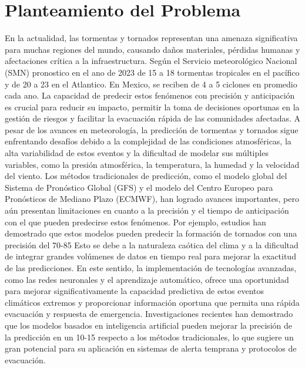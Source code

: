 \documentclass{article}
\begin{document}
\section{Planteamiento del Problema}
En la actualidad, las tormentas y tornados representan una amenaza significativa para muchas regiones del mundo, causando daños materiales, pérdidas humanas y afectaciones crítica a la infraestructura. Según el Servicio meteorológico Nacional (SMN) pronostico en el ano de 2023 de 15 a 18 tormentas tropicales en el pacífico y de 20 a 23 en el Atlantico. En Mexico, se reciben de 4 a 5 ciclones en promedio cada ano. La capacidad de predecir estos fenómenos con precisión y anticipación es crucial para reducir su impacto, permitir la toma de decisiones oportunas en la gestión de riesgos y facilitar la evacuación rápida de las comunidades afectadas.
A pesar de los avances en meteorología, la predicción de tormentas y tornados sigue enfrentando desafíos debido a la complejidad de las condiciones atmosféricas, la alta variabilidad de estos eventos y la dificultad de modelar sus múltiples variables, como la presión atmosférica, la temperatura, la humedad y la velocidad del viento. Los métodos tradicionales de predicción, como el modelo global del Sistema de Pronóstico Global (GFS) y el modelo del Centro Europeo para Pronósticos de Mediano Plazo (ECMWF), han logrado avances importantes, pero aún presentan limitaciones en cuanto a la precisión y el tiempo de anticipación con el que pueden predecirse estos fenómenos. Por ejemplo, estudios han demostrado que estos modelos pueden predecir la formación de tornados con una precisión del 70-85 %
Esto se debe a la naturaleza caótica del clima y a la dificultad de integrar grandes volúmenes de datos en tiempo real para mejorar la exactitud de las predicciones. En este sentido, la implementación de tecnologías avanzadas, como las redes neuronales y el aprendizaje automático, ofrece una oportunidad para mejorar significativamente la capacidad predictiva de estos eventos climáticos extremos y proporcionar información oportuna que permita una rápida evacuación y respuesta de emergencia. Investigaciones recientes han demostrado que los modelos basados en inteligencia artificial pueden mejorar la precisión de la predicción en un 10-15 respecto a los métodos tradicionales, lo que sugiere un gran potencial para su aplicación en sistemas de alerta temprana y protocolos de evacuación.
\end{document}
